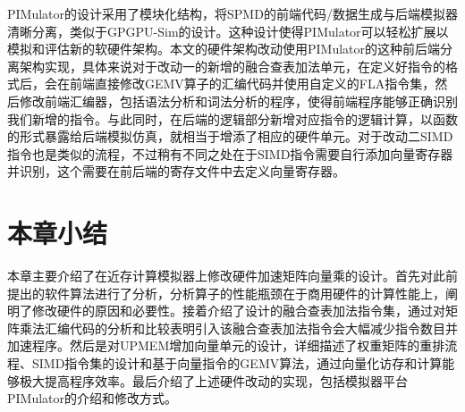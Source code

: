 PIMulator的设计采用了模块化结构，将SPMD的前端代码/数据生成与后端模拟器清晰分离，类似于GPGPU-Sim的设计。这种设计使得PIMulator可以轻松扩展以模拟和评估新的软硬件架构。本文的硬件架构改动使用PIMulator的这种前后端分离架构实现，具体来说对于改动一的新增的融合查表加法单元，在定义好指令的格式后，会在前端直接修改GEMV算子的汇编代码并使用自定义的FLA指令集，然后修改前端汇编器，包括语法分析和词法分析的程序，使得前端程序能够正确识别我们新增的指令。与此同时，在后端的逻辑部分新增对应指令的逻辑计算，以函数的形式暴露给后端模拟仿真，就相当于增添了相应的硬件单元。对于改动二SIMD指令也是类似的流程，不过稍有不同之处在于SIMD指令需要自行添加向量寄存器并识别，这个需要在前后端的寄存文件中去定义向量寄存器。

\section{本章小结}
本章主要介绍了在近存计算模拟器上修改硬件加速矩阵向量乘的设计。首先对此前提出的软件算法进行了分析，分析算子的性能瓶颈在于商用硬件的计算性能上，阐明了修改硬件的原因和必要性。接着介绍了设计的融合查表加法指令集，通过对矩阵乘法汇编代码的分析和比较表明引入该融合查表加法指令会大幅减少指令数目并加速程序。然后是对UPMEM增加向量单元的设计，详细描述了权重矩阵的重排流程、SIMD指令集的设计和基于向量指令的GEMV算法，通过向量化访存和计算能够极大提高程序效率。最后介绍了上述硬件改动的实现，包括模拟器平台PIMulator的介绍和修改方式。